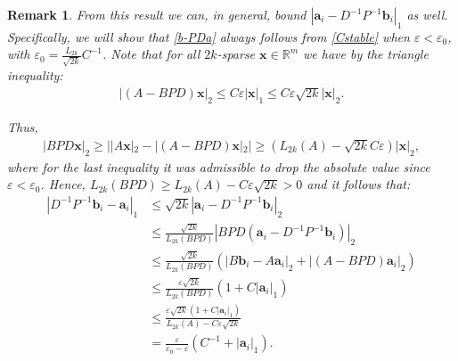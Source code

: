 \documentclass[journal, onecolumn]{IEEEtran}
\newtheorem{remark}{Remark}
\begin{document}
\begin{remark}\label{b-PDaProof}
From this result we can, in general, bound $|\mathbf{a}_i - D^{-1}P^{-1}\mathbf{b}_i|_1$ as well. Specifically, we will show that \eqref{b-PDa} always follows from \eqref{Cstable} when $\varepsilon < \varepsilon_0$, with $\varepsilon_0 = \frac{L_{2k}}{\sqrt{2k}}C^{-1}$. Note that for all $2k$-sparse $\mathbf{x} \in \mathbb{R}^m$ we have by the triangle inequality:
\begin{align*}
|(A-BPD)\mathbf{x}|_2 
\leq C\varepsilon|\mathbf{x}|_1
\leq C \varepsilon \sqrt{2k}  |\mathbf{x}|_2.
\end{align*}

Thus,
\begin{align*}
|BPD\mathbf{x}|_2 
\geq | |A\mathbf{x}|_2 - |(A-BPD)\mathbf{x}|_2 |
\geq (L_{2k}(A) - \sqrt{2k}C\varepsilon ) |\mathbf{x}|_2,
\end{align*}
%
where for the last inequality it was admissible to drop the absolute value since $\varepsilon < \varepsilon_0$. Hence, $L_{2k}(BPD) \geq L_{2k}(A) - C\varepsilon \sqrt{2k} > 0$ and it follows that:
\begin{align*}
|D^{-1}P^{-1}\mathbf{b}_i - \mathbf{a}_i|_1
&\leq \sqrt{2k} |\mathbf{a}_i - D^{-1}P^{-1}\mathbf{b}_i|_2 \\
&\leq \frac{\sqrt{2k}}{L_{2k}(BPD)}|BPD(\mathbf{a}_i - D^{-1}P^{-1}\mathbf{b}_i)|_2 \\
&\leq \frac{\sqrt{2k}}{L_{2k}(BPD)} (|B\mathbf{b}_i - A\mathbf{a}_i|_2 + |(A - BPD)\mathbf{a}_i|_2) \\
&\leq \frac{\varepsilon\sqrt{2k}}{L_{2k}(BPD)}(1+C|\mathbf{a}_i|_1) \\
&\leq \frac{\varepsilon\sqrt{2k}(1+C|\mathbf{a}_i|_1)}{L_{2k}(A) - C\varepsilon\sqrt{2k}} \\
&= \frac{\varepsilon }{\varepsilon_0 - \varepsilon} \left( C^{-1}+|\mathbf{a}_i|_1 \right).
\end{align*}
\end{remark}

%
\end{document}
